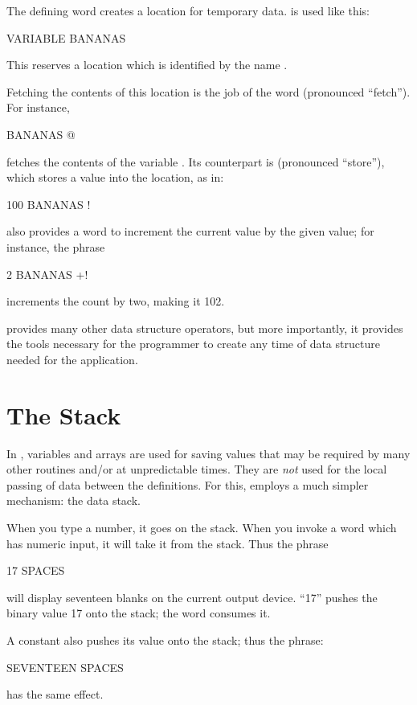 The defining word  creates a location
for temporary data.  is used like this:
\begin{Code}
VARIABLE BANANAS
\end{Code}
This reserves a location which is identified by the name .

Fetching the contents of this location is the job of the word 
(pronounced ``fetch'').  For instance,
\begin{Code}
BANANAS @
\end{Code}
fetches the contents of the variable .  Its counterpart is \forthb{!}
(pronounced ``store''), which stores a value into the location, as in:
\begin{Code}
100 BANANAS !
\end{Code}
\Forth{} also provides a word to increment the current value by the given
value; for instance, the phrase
\begin{Code}
2 BANANAS +!
\end{Code}
increments the count by two, making it 102.

\Forth{} provides many other
data structure operators, but more
importantly, it provides the tools necessary for the programmer to
create any time of data structure needed for the application.%
%

\section{The Stack}
In \Forth{}, variables and arrays are used for saving values that may be
required by many other routines and/or at unpredictable times.  They are {\em not}
used for the local passing of data between the definitions.  For this, \Forth{}
employs a much simpler mechanism: the data stack.

When you type a number, it goes on the stack.  When you invoke a 
word which has numeric input, it will take it from the stack.  Thus the
phrase
\begin{Code}
17 SPACES
\end{Code}
will display seventeen blanks on the current output device.  ``17'' pushes
the binary value 17 onto the stack; the word  consumes it.

A constant also pushes its value onto the stack; thus the phrase:
\begin{Code}
SEVENTEEN SPACES
\end{Code}
has the same effect.

